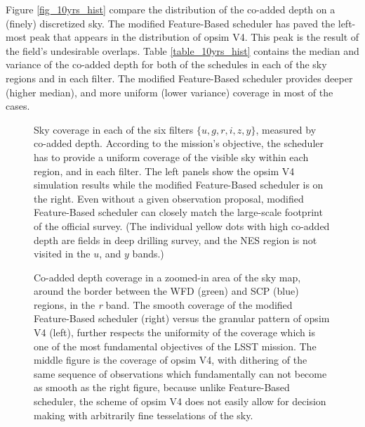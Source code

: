 \documentclass[12pt]{aastex62}
\theoremstyle{definition}
\begin{document}
Figure \ref{fig_10yrs_hist} compare the distribution of the co-added depth on a (finely) discretized sky. The modified Feature-Based scheduler has paved the left-most peak that appears in the distribution of opsim V4. This peak is the result of the field's undesirable overlaps. Table \ref{table_10yrs_hist} contains the median and variance of the co-added depth for both of the schedules in each of the sky regions and in each filter. The modified Feature-Based scheduler provides deeper (higher median), and more uniform (lower variance) coverage in most of the cases.

\begin{figure}[h!]
\caption{Sky coverage in each of the six filters $\{ u, g, r, i, z, y\}$, measured by co-added depth. According to the mission's objective, the scheduler has to provide a uniform coverage of the visible sky within each region, and in each filter. The left panels show the opsim V4 simulation results while the modified Feature-Based scheduler is on the right. Even without a given observation proposal, modified Feature-Based scheduler can closely match the large-scale footprint of the official survey. (The individual yellow dots with high co-added depth are fields in deep drilling survey, and the NES region is not visited in the $u$, and $y$ bands.)}
\label{fig_10yrs_skymap}
\end{figure}


\begin{figure}
\caption{Co-added depth coverage in a zoomed-in area of the sky map, around the border between the WFD (green) and SCP (blue) regions, in the \textit{r} band. The smooth coverage of the modified Feature-Based scheduler (right) versus the granular pattern of opsim V4 (left), further respects the uniformity of the coverage which is one of the most fundamental objectives of the LSST mission. The middle figure is the coverage of opsim V4, with dithering of the same sequence of observations which fundamentally can not become as smooth as the right figure, because unlike Feature-Based scheduler, the scheme of opsim V4 does not easily allow for decision making with arbitrarily fine tesselations of the sky.}\label{fig_zoomin_r}
\end{figure}
\end{document}
